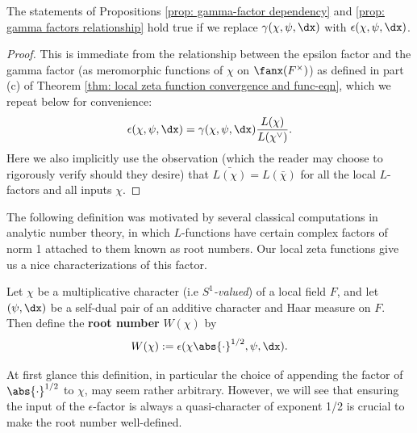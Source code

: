 \documentclass[11pt, x11names, openany]{book}
\begin{document}
    \begin{corollary}
        \label{cor: epsilon factors relationship}
        The statements of Propositions \ref{prop: gamma-factor dependency} and \ref{prop: gamma factors relationship} hold true if we replace $\gamma(\chi, \psi, \dx)$ with $\epsilon(\chi, \psi, \dx)$.
    \end{corollary}
    \begin{proof}
    This is immediate from the relationship between the epsilon factor and the gamma factor (as meromorphic functions of $\chi$ on $\fanx(F^\times)$) as defined in part (c) of Theorem \ref{thm: local zeta function convergence and func-eqn}, which we repeat below for convenience:
    \begin{equation*}
        \epsilon(\chi, \psi, \dx) = \gamma(\chi, \psi, \dx) \frac{L(\chi)}{L(\chi^\lor)}.
    \end{equation*}
    Here we also implicitly use the observation (which the reader may choose to rigorously verify should they desire) that $\bar{L(\chi)} = L(\bar{\chi})$ for all the local $L$-factors and all inputs $\chi$. 
\end{proof}




The following definition was motivated by several classical computations in analytic number theory, in which $L$-functions have certain complex factors of norm 1 attached to them known as root numbers. Our local zeta functions give us a nice characterizations of this factor.
\begin{defn}
\label{def: root number}
    Let $\chi$ be a multiplicative character (i.e \textit{$S^1$-valued}) of a local field $F$, and let $(\psi, \dx)$ be a self-dual pair of an additive character and Haar measure on $F$. Then define the \textbf{root number} $W(\chi)$ by
    \begin{equation*}
        W(\chi) := \epsilon(\chi \abs{\cdot}^{1/2}, \psi, \dx).
    \end{equation*}
\end{defn}

\begin{remark}
At first glance this definition, in particular the choice of appending the factor of $\abs{\cdot}^{1/2}$ to $\chi$, may seem rather arbitrary. However, we will see that ensuring the input of the $\epsilon$-factor is always a quasi-character of exponent 1/2 is crucial to make the root number well-defined.
\end{remark}
 
\end{document}
